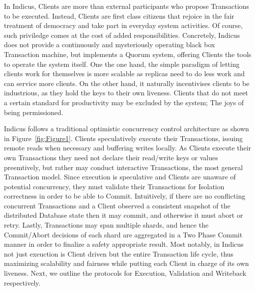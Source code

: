 In Indicus, Clients are more than external participants who propose Transactions to be executed. Instead, Clients are first class citizens that rejoice in the fair treatment of democracy and take part in everyday system activities. Of course, such priviledge comes at the cost of added responsibilities. Concretely, Indicus does not provide a continuously and mysteriously operating black box Transaction machine, but implements a Quorum system, offering Clients the tools to operate the system itself. One the one hand, the simple paradigm of letting clients work for themselves is more scalable as replicas need to do less work and can service more clients. On the other hand, it naturally incentivises clients to be industrious, as they hold the keys to their own liveness. Clients that do not meet a certain standard for productivity may be excluded by the system; The joys of being permissioned.

Indicus follows a traditional optimistic concurrency control architecture as shown in Figure~\ref{fig:Figure1}. Clients speculatively execute their Transactions, issuing remote reads when necessary and buffering writes locally. As Clients execute their own Transactions they need not declare their read/write keys or values preemtively, but rather may conduct interactive Transactions, the most general Transaction model. Since execution is speculative and Clients are unaware of potential concurrency, they must validate their Transactions for Isolation correctness in order to be able to Commit. Intuitively, if there are no conflicting concurrent Transactions and a Client observed a consistent snapshot of the distributed Database state then it may commit, and otherwise it must abort or retry. Lastly, Transactions may span multiple shards, and hence the Commit/Abort decisions of each shard are aggregated in a Two Phase Commit manner in order to finalize a safety appropriate result. Most notably, in Indicus not just exeuction is Client driven but the entire Transaction life cycle, thus maximizing scalability and fairness while putting each Client in charge of its own liveness.
Next, we outline the protocols for Execution, Validation and Writeback respectively.

